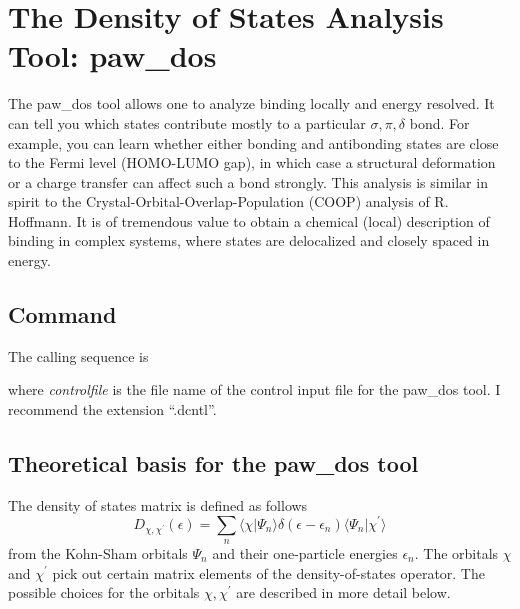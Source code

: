 \documentclass[final,12pt]{article}
\begin{document}
{%
\newpage
\section{The Density of States Analysis Tool: paw\_dos}
The paw\_dos tool allows one to analyze binding locally and energy
resolved. It can tell you which states contribute mostly to a
particular $\sigma, \pi, \delta$ bond. For example, you can learn whether
either bonding and antibonding states are close to the Fermi level
(HOMO-LUMO gap), in which case a structural deformation or a charge
transfer can affect such a bond strongly. This analysis is similar in
spirit to the Crystal-Orbital-Overlap-Population (COOP) analysis of R.
Hoffmann. It is of tremendous value to obtain a chemical (local)
description of binding in complex systems, where states are
delocalized and closely spaced in energy.

\subsection{Command}

The calling sequence is

\bigskip{}\bigskip

\noindent
where {\it controlfile} is the file name of the control input file for
the paw\_dos tool. I recommend the extension ``.dcntl''.


\subsection{Theoretical basis for the paw\_dos tool}

The density of states matrix is defined as follows
\begin{equation}
  D_{\chi,\chi^\prime}(\epsilon)
 =\sum_n
  \langle\chi|\Psi_n\rangle
\delta(\epsilon-\epsilon_n)
\langle\Psi_n|\chi^\prime\rangle
\end{equation}
from the Kohn-Sham orbitals $\Psi_n$ and their one-particle energies
$\epsilon_n$. The orbitals $\chi$ and $\chi^\prime$ pick out certain
matrix elements of the density-of-states operator. The possible
choices for the orbitals $\chi,\chi^\prime$ are described in more
detail below.

}
\end{document}
